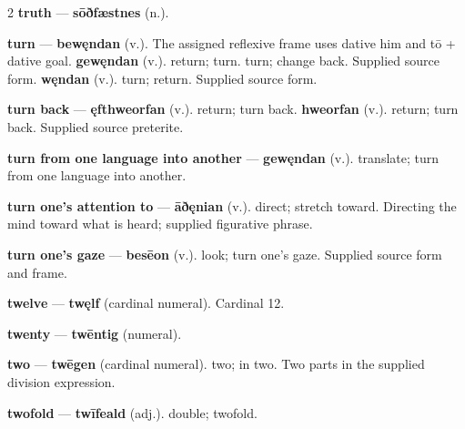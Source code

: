 \begin{multicols}{2}
\textbf{truth} — \textbf{sōðfæstnes} (n.).\par
\textbf{turn} — \textbf{bewęndan} (v.). The assigned reflexive frame uses dative him and tō + dative goal. \textbf{gewęndan} (v.). return; turn. turn; change back. Supplied source form. \textbf{węndan} (v.). turn; return. Supplied source form.\par
\textbf{turn back} — \textbf{ęfthweorfan} (v.). return; turn back. \textbf{hweorfan} (v.). return; turn back. Supplied source preterite.\par
\textbf{turn from one language into another} — \textbf{gewęndan} (v.). translate; turn from one language into another.\par
\textbf{turn one's attention to} — \textbf{āðęnian} (v.). direct; stretch toward. Directing the mind toward what is heard; supplied figurative phrase.\par
\textbf{turn one's gaze} — \textbf{besēon} (v.). look; turn one's gaze. Supplied source form and frame.\par
\textbf{twelve} — \textbf{twęlf} (cardinal numeral). Cardinal 12.\par
\textbf{twenty} — \textbf{twēntig} (numeral).\par
\textbf{two} — \textbf{twēgen} (cardinal numeral). two; in two. Two parts in the supplied division expression.\par
\textbf{twofold} — \textbf{twīfeald} (adj.). double; twofold.\par

\end{multicols}
